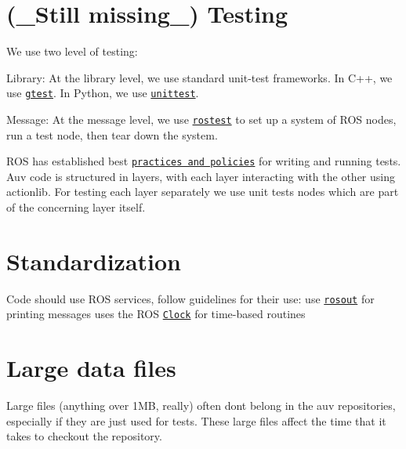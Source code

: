  \hypertarget{md_coding_docs_coding_guidelines_autotoc_md4}{}\section{(\+\_\+\+Still missing\+\_\+)  Testing}\label{md_coding_docs_coding_guidelines_autotoc_md4}
We use two level of testing\+:
\begin{DoxyItemize}
\item Library\+: At the library level, we use standard unit-\/test frameworks. In C++, we use \href{http://wiki.ros.org/gtest}{\tt gtest}. In Python, we use \href{http://wiki.ros.org/unittest}{\tt unittest}.
\item Message\+: At the message level, we use \href{http://wiki.ros.org/rostest}{\tt rostest} to set up a system of R\+OS nodes, run a test node, then tear down the system.
\end{DoxyItemize}

R\+OS has established best \href{http://wiki.ros.org/UnitTesting}{\tt practices and policies} for writing and running tests. Auv code is structured in layers, with each layer interacting with the other using {\ttfamily actionlib}. For testing each layer separately we use unit tests nodes which are part of the concerning layer itself.



\hypertarget{md_coding_docs_coding_guidelines_autotoc_md5}{}\section{Standardization}\label{md_coding_docs_coding_guidelines_autotoc_md5}
Code should use R\+OS services, follow guidelines for their use\+: use \href{http://wiki.ros.org/rosout}{\tt rosout} for printing messages uses the R\+OS \href{http://wiki.ros.org/Clock}{\tt Clock} for time-\/based routines



\hypertarget{md_coding_docs_coding_guidelines_autotoc_md6}{}\section{Large data files}\label{md_coding_docs_coding_guidelines_autotoc_md6}
Large files (anything over 1\+MB, really) often don\textquotesingle{}t belong in the auv repositories, especially if they are just used for tests. These large files affect the time that it takes to checkout the repository.



